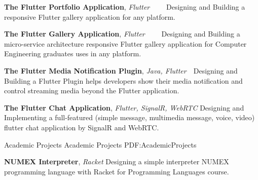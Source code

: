 \documentclass[letterpaper,MMMyyyy,nonstopmode]{resume}
\newcommand{\CVWebpage}{https://aliyazdi.tech}
\begin{document}
\begin{Body}
\BigGap
\BulletItem
\textbf{The Flutter Portfolio Application},
\textit{\small{Flutter}}
\hfill
{\normalsize{
\href{https://snapcraft.io/aliyazdi75}
{\faLinux}
\,\SubBulletSymbol\,
\href{https://github.com/aliyazdi75/aliyazdi75.github.io/releases}
{\faAndroid}
\,\SubBulletSymbol\,
\href{\CVWebpage}
{\faGlobe}
\,\SubBulletSymbol\,
\href{https://github.com/aliyazdi75/aliyazdi75.github.io}
{\faGithub}
}}
\Item
Designing and Building a responsive Flutter gallery application for any platform.

\BigGap
\BulletItem
\textbf{The Flutter Gallery Application},
\textit{\small{Flutter}}
\hfill
{\normalsize{
\href{https://medium.com/flutter-community/the-software-engineering-approach-in-cross-platform-programming-with-flutter-part-1-efcdc8a8fc26}
{\faMedium}
\,\SubBulletSymbol\,
\href{https://github.com/aliyazdi75/gallery/releases}
{\faAndroid}
\,\SubBulletSymbol\,
\href{https://aliyazdi75.github.io/gallery}
{\faGlobe}
\,\SubBulletSymbol\,
\href{https://github.com/aliyazdi75/gallery}
{\faGithub}
}}
\Item
Designing and Building a micro-service architecture responsive Flutter gallery application for Computer Engineering graduates uses in any platform.

\BigGap
\BulletItem
\textbf{The Flutter Media Notification Plugin},
\textit{\small{Java, Flutter}}
\hfill
{\normalsize{
\href{https://pub.dev/packages/flutter_media_notification}
{\faGlobe}
\,\SubBulletSymbol\,
\href{https://github.com/aliyazdi75/flutter_media_notification}
{\faGithub}
}}
\Item
Designing and Building a Flutter Plugin helps developers show their media notification and control streaming media beyond the Flutter application.

\BigGap
\BulletItem
\textbf{The Flutter Chat Application},
\textit{\small{Flutter, SignalR, WebRTC}}
\hfill
{\normalsize{
\href{https://github.com/aliyazdi75/flutter_chat}
{\faGithub}
}}
\Item
Designing and Implementing a full-featured (simple message, multimedia message, voice, video) flutter chat application by SignalR and WebRTC.


\Section
{Academic Projects}
{Academic Projects}
{PDF:AcademicProjects}


\BulletItem
\textbf{NUMEX Interpreter},
\textit{\small{Racket}}
\hfill
{\normalsize{
\href{https://github.com/aliyazdi75/NUMEX-Interpreter}
{\faGithub}
}}
\Item
Designing a simple interpreter NUMEX programming language
with Racket for Programming Languages course.


\end{Body}
\end{document}
